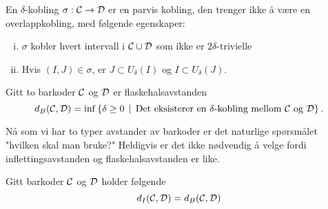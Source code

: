 \begin{definisjon}\label{def:delta-kobling}
En $\delta$-kobling $\sigma:\mathcal{C}\to \mathcal{D}$ er en parvis kobling, den trenger ikke å være en overlappkobling, med følgende egenskaper:
\begin{enumerate}[(i)]
    \item $\sigma$ kobler hvert intervall i $\mathcal{C}\cup\mathcal{D}$ som ikke er $2\delta$-trivielle
    \item Hvis $(I,J)\in\sigma$, er $J\subset U_\delta(I)$ og $I\subset U_\delta(J)$.
\end{enumerate}
\end{definisjon}

\begin{definisjon}\label{def:FlaskAvst}
Gitt to barkoder $\mathcal{C}$ og $\mathcal{D}$ er flaskehalsavstanden
\[d_B(\mathcal{C},\mathcal{D}) = \inf\left\{\delta\geq 0\,\mid\,\text{Det eksisterer en $\delta$-kobling mellom $\mathcal{C}$ og $\mathcal{D}$}\right\}.\]
\end{definisjon}

Nå som vi har to typer avstander av barkoder er det naturlige spørsmålet "hvilken skal man bruke?" Heldigvis er det ikke nødvendig å velge fordi inflettingsavstanden og flaskehalsavstanden er like.



\begin{teorem}\label{trm:FA_lik_IA}
Gitt barkoder $\mathcal{C}$ og $\mathcal{D}$ holder følgende
\[d_I(\mathcal{C},\mathcal{D}) = d_B(\mathcal{C},\mathcal{D})\]
\end{teorem}
\bevis{

}